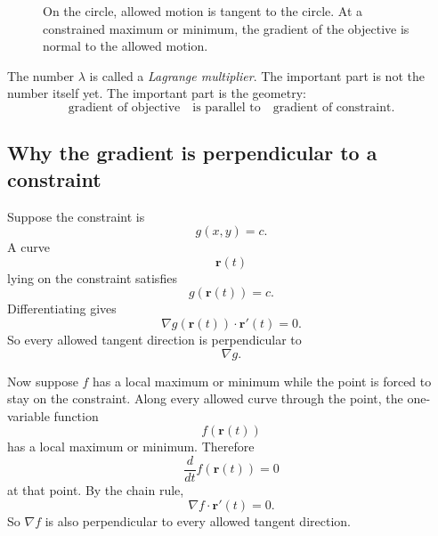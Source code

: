 \begin{figure}[h]
\centering
{}
\caption{On the circle, allowed motion is tangent to the circle.  At a constrained
maximum or minimum, the gradient of the objective is normal to the allowed motion.}
\end{figure}

The number \(\lambda\) is called a \emph{Lagrange multiplier}.  The important part is
not the number itself yet.  The important part is the geometry:
\[
    \text{gradient of objective}
    \quad
    \text{is parallel to}
    \quad
    \text{gradient of constraint}.
\]

\subsection{Why the gradient is perpendicular to a constraint}

Suppose the constraint is
\[
    g(x,y)=c.
\]
A curve
\[
    \mathbf r(t)
\]
lying on the constraint satisfies
\[
    g(\mathbf r(t))=c.
\]
Differentiating gives
\[
    \nabla g(\mathbf r(t))\cdot \mathbf r'(t)=0.
\]
So every allowed tangent direction is perpendicular to
\[
    \nabla g.
\]

Now suppose \(f\) has a local maximum or minimum while the point is forced to stay
on the constraint.  Along every allowed curve through the point, the one-variable
function
\[
    f(\mathbf r(t))
\]
has a local maximum or minimum.  Therefore
\[
    \frac{d}{dt}f(\mathbf r(t))=0
\]
at that point.  By the chain rule,
\[
    \nabla f\cdot \mathbf r'(t)=0.
\]
So \(\nabla f\) is also perpendicular to every allowed tangent direction.

